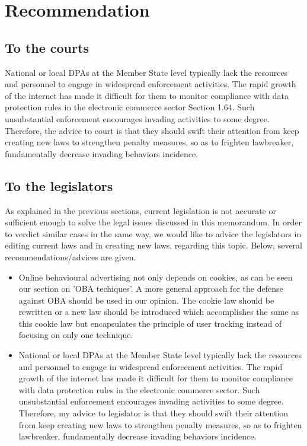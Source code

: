 \documentclass[11pt]{article}
\begin{document}
\section{Recommendation}
\subsection{To the courts}

National or local DPAs at the Member State level typically lack the resources and personnel to engage in widespread enforcement activities. The rapid growth of the internet has made it difficult for them to monitor compliance with data protection rules in the electronic commerce sector \cite{MSIberica} Section 1.64. Such unsubstantial enforcement encourages invading activities to some degree. Therefore, the advice to court is that they should swift their attention from keep creating new laws to strengthen penalty measures, so as to frighten lawbreaker, fundamentally decrease invading behaviors incidence.

\subsection{To the legislators}
As explained in the previous sections, current legislation is not accurate or sufficient enough to solve the legal issues discussed in this memorandum. In order to verdict similar cases in the same way, we would like to advice the legislators in editing current laws and in creating new laws, regarding this topic. Below, several recommendations/advices are given.


\begin{itemize}
	\item Online behavioural advertising not only depends on cookies, as can be seen our section on 'OBA techiques'. A more general approach for the defense against OBA should be used in our opinion. The cookie law \cite{cookielaw} should be rewritten or a new law should be introduced which accomplishes the same as this cookie law but encapsulates the principle of user tracking instead of focusing on only one technique.
	\item National or local DPAs at the Member State level typically lack the resources and personnel to engage in widespread enforcement activities. The rapid growth of the internet has made it difficult for them to monitor compliance with data protection rules in the electronic commerce sector. Such unsubstantial enforcement encourages invading activities to some degree. Therefore, my advice to legislator is that they should swift their attention from keep creating new laws to strengthen penalty measures, so as to frighten lawbreaker, fundamentally decrease invading behaviors incidence.
\end{itemize}
\end{document}

